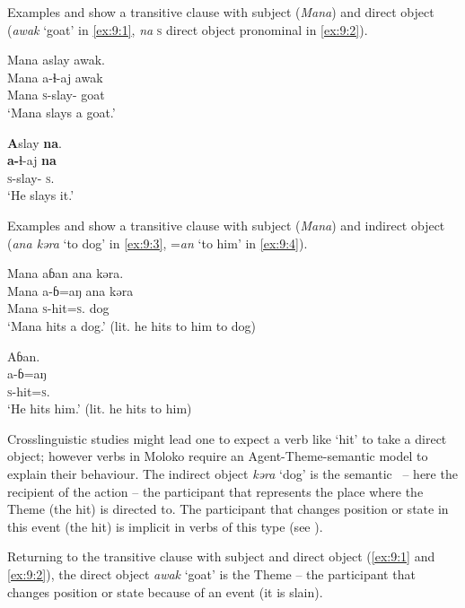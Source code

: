 Examples  and  show a transitive clause with subject (\textit{Mana}) and direct object (\textit{awak} ‘goat’ in \ref{ex:9:1}, \textit{na} \textsc{s} direct object pronominal in \ref{ex:9:2}).

\ea \label{ex:9:1}
Mana  aslay  awak.\\
\gll  Mana a{}-ɬ{}-aj    awak\\
      Mana  \textsc{s}-slay{}-{\CL}  goat\\
\glt  ‘Mana slays a goat.’ 
\z

\ea \label{ex:9:2}
\textbf{A}slay  \textbf{na}.\\
\gll  \textbf{a-}ɬ{}-aj      \textbf{na}\\
      \textsc{s}-slay{}-{\CL}      \textsc{s}.{\DO}\\
\glt  ‘He slays it.’ 
\z

Examples  and  show a transitive clause with subject (\textit{Mana}) and indirect object (\textit{ana kəra} ‘to dog’ in \ref{ex:9:3}, =\textit{an} ‘to him’ in \ref{ex:9:4}). 

\ea \label{ex:9:3}
Mana  aɓan  ana  kəra. \\
\gll  Mana   a-ɓ=aŋ    ana   kəra \\
      Mana  \textsc{s}-hit=\textsc{s}.{\IO}  {\DAT} dog\\
\glt  ‘Mana hits a dog.’ (lit. he hits to him to dog)
\z

\ea \label{ex:9:4}
Aɓan. \\
\gll  a-ɓ=aŋ \\
      \textsc{s}-hit=\textsc{s}.{\IO}\\
\glt  ‘He hits him.’ (lit. he hits to him)
\z

Crosslinguistic studies might lead one to expect a verb like ‘hit’ to take a direct object; however verbs in Moloko require an Agent-Theme-\LOC semantic model to explain their behaviour. The indirect object \textit{kəra} ‘dog’ is the semantic \LOC \ -- here the recipient of the action -- the participant that represents the place where the Theme (the hit) is directed to. The participant that changes position or state in this event (the hit) is implicit in verbs of this type (see ). 

Returning to the transitive clause with subject and direct object (\ref{ex:9:1} and \ref{ex:9:2}), the direct object \textit{awak} ‘goat’ is the Theme -- the participant that changes position or state because of an event (it is slain). 

